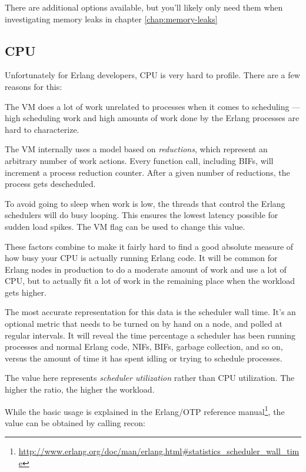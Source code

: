 \documentclass[11pt, oneside]{book}   	%
\begin{document}
There are additional options available, but you'll likely only need them when investigating memory leaks in chapter \ref{chap:memory-leaks}

\subsection{CPU}
\label{subsec:global-cpu}

Unfortunately for Erlang developers, CPU is very hard to profile. There are a few reasons for this:

\begin{itemize*}
	\item The VM does a lot of work unrelated to processes when it comes to scheduling — high scheduling work and high amounts of work done by the Erlang processes are hard to characterize.
	\item The VM internally uses a model based on \emph{reductions}, which represent an arbitrary number of work actions. Every function call, including BIFs, will increment a process reduction counter. After a given number of reductions, the process gets descheduled.
	\item To avoid going to sleep when work is low, the threads that control the Erlang schedulers will do busy looping. This ensures the lowest latency possible for sudden load spikes. The VM flag  can be used to change this value.
\end{itemize*}

These factors combine to make it fairly hard to find a good absolute measure of how busy your CPU is actually running Erlang code. It will be common for Erlang nodes in production to do a moderate amount of work and use a lot of CPU, but to actually fit a lot of work in the remaining place when the workload gets higher.

The most accurate representation for this data is the scheduler wall time. It's an optional metric that needs to be turned on by hand on a node, and polled at regular intervals. It will reveal the time percentage a scheduler has been running processes and normal Erlang code, NIFs, BIFs, garbage collection, and so on, versus the amount of time it has spent idling or trying to schedule processes.

The value here represents \emph{scheduler utilization} rather than CPU utilization. The higher the ratio, the higher the workload.

While the basic usage is explained in the Erlang/OTP reference manual\footnote{\href{http://www.erlang.org/doc/man/erlang.html\#statistics\_scheduler\_wall\_time}{http://www.erlang.org/doc/man/erlang.html\#statistics\_scheduler\_wall\_time}}, the value can be obtained by calling recon:
\end{document}
